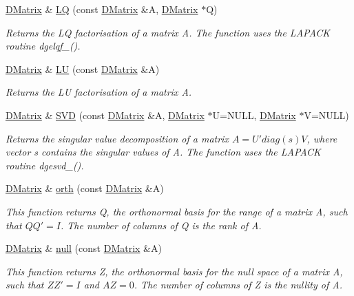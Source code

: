 \begin{DoxyCompactItemize}
\hyperlink{classDMatrix}{DMatrix} \& \hyperlink{classDMatrix_a1ccd9a0ef8a37d739b31e85f84c2743c}{LQ} (const \hyperlink{classDMatrix}{DMatrix} \&A, \hyperlink{classDMatrix}{DMatrix} $\ast$Q)
\begin{DoxyCompactList}\small\item\em Returns the LQ factorisation of a matrix A. The function uses the LAPACK routine dgelqf\_\-(). \item\end{DoxyCompactList}\item 
\hyperlink{classDMatrix}{DMatrix} \& \hyperlink{classDMatrix_a71dd04fdd14b319042752e184ded3393}{LU} (const \hyperlink{classDMatrix}{DMatrix} \&A)
\begin{DoxyCompactList}\small\item\em Returns the LU factorisation of a matrix A. \item\end{DoxyCompactList}\item 
\hyperlink{classDMatrix}{DMatrix} \& \hyperlink{classDMatrix_afb39cb034e5bef5e4e416a22d53afb56}{SVD} (const \hyperlink{classDMatrix}{DMatrix} \&A, \hyperlink{classDMatrix}{DMatrix} $\ast$U=NULL, \hyperlink{classDMatrix}{DMatrix} $\ast$V=NULL)
\begin{DoxyCompactList}\small\item\em Returns the singular value decomposition of a matrix $ A = U' diag(s) V $, where vector s contains the singular values of A. The function uses the LAPACK routine dgesvd\_\-(). \item\end{DoxyCompactList}\item 
\hyperlink{classDMatrix}{DMatrix} \& \hyperlink{classDMatrix_ad80782cbeec0075aeaa43fc2e2264cc0}{orth} (const \hyperlink{classDMatrix}{DMatrix} \&A)
\begin{DoxyCompactList}\small\item\em This function returns Q, the orthonormal basis for the range of a matrix A, such that $ Q Q' = I $. The number of columns of Q is the rank of A. \item\end{DoxyCompactList}\item 
\hyperlink{classDMatrix}{DMatrix} \& \hyperlink{classDMatrix_a038aceaf8588f3f7743562f598cab15d}{null} (const \hyperlink{classDMatrix}{DMatrix} \&A)
\begin{DoxyCompactList}\small\item\em This function returns Z, the orthonormal basis for the null space of a matrix A, such that $ Z Z' = I $ and $ A Z=0 $. The number of columns of Z is the nullity of A. \item\end{DoxyCompactList}\item 

\end{DoxyCompactItemize}
